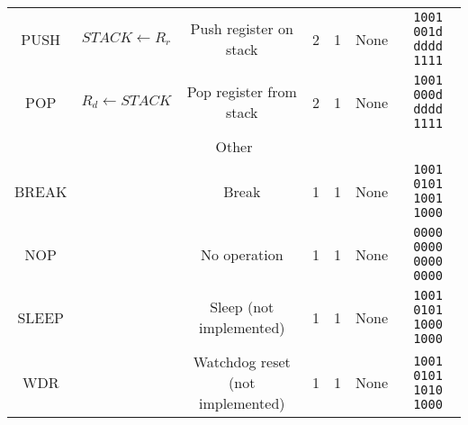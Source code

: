 \documentclass[11pt]{article}
\begin{document}
\begin{center}
\begin{longtable}{|c|c|c|c|c|c|c|}
PUSH & $STACK \leftarrow R_r$ & Push register on stack & 2 & 1 & None & \texttt{1001 001d dddd 1111}\\
POP & $R_d \leftarrow STACK$ & Pop register from stack & 2 & 1 & None & \texttt{1001 000d dddd 1111}\\
\hline\hline
\multicolumn{7}{|c|}{Other} \\
\hline
BREAK &  &  Break & 1 & 1 & None & \texttt{1001 0101 1001 1000}\\
NOP &  &  No operation & 1 & 1 & None & \texttt{0000 0000 0000 0000}\\
SLEEP &  & Sleep (not implemented) & 1 & 1 & None & \texttt{1001 0101 1000 1000}\\
WDR &  & Watchdog reset (not implemented) & 1 & 1 & None & \texttt{1001 0101 1010 1000}\\
\hline
\end{longtable}
\end{center}
\end{document}
